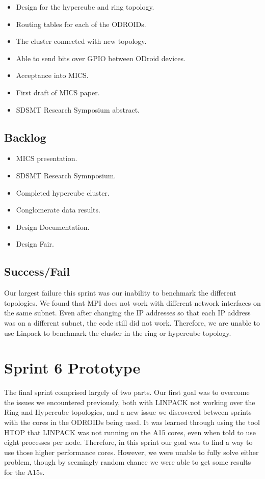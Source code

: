 \begin{itemize}
\item Design for the hypercube and ring topology.
\item Routing tables for each of the ODROIDs.
\item The cluster connected with new topology.
\item Able to send bits over GPIO between ODroid devices.
\item Acceptance into MICS.
\item First draft of MICS paper.
\item SDSMT Research Symposium abstract.
\end{itemize}

\subsection{Backlog}

\begin{itemize}
\item MICS presentation.
\item SDSMT Research Symnposium.
\item Completed hypercube cluster.
\item Conglomerate data results.
\item Design Documentation.
\item Design Fair.
\end{itemize}

\subsection{Success/Fail}

Our largest failure this sprint was our inability to benchmark the different topologies. We found that MPI does not work with different network interfaces on the same subnet. Even after changing the IP addresses so that each IP address was on a different subnet, the code still did not work. Therefore, we are unable to use Linpack to benchmark the cluster in the ring or hypercube topology.

\section{Sprint 6 Prototype}

The final sprint comprised largely of two parts. Our first goal was to overcome the issues we encountered previously, both with LINPACK not working over the Ring and Hypercube topologies, and a new issue we discovered between sprints with the cores in the ODROIDs being used. It was learned through using the tool HTOP that LINPACK was not running on the A15 cores, even when told to use eight processes per node. Therefore, in this sprint our goal was to find a way to use those higher performance cores. However, we were unable to fully solve either problem, though by seemingly random chance we were able to get some results for the A15s. \\

